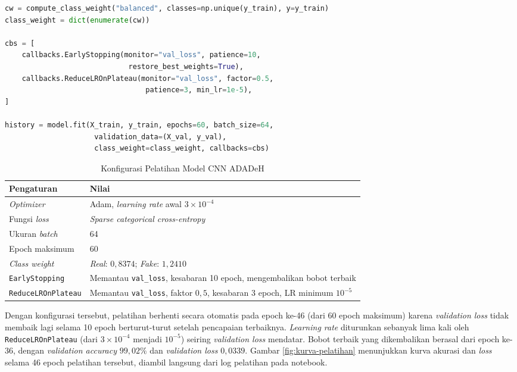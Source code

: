 \begin{lstlisting}[language=Python, caption={Pelatihan model CNN dengan \textit{class weight} dan \textit{callback}}, label={lst:pelatihan}]
cw = compute_class_weight("balanced", classes=np.unique(y_train), y=y_train)
class_weight = dict(enumerate(cw))

cbs = [
    callbacks.EarlyStopping(monitor="val_loss", patience=10,
                             restore_best_weights=True),
    callbacks.ReduceLROnPlateau(monitor="val_loss", factor=0.5,
                                 patience=3, min_lr=1e-5),
]

history = model.fit(X_train, y_train, epochs=60, batch_size=64,
                     validation_data=(X_val, y_val),
                     class_weight=class_weight, callbacks=cbs)
\end{lstlisting}

\begin{table}[htbp]
  \centering
  \caption{Konfigurasi Pelatihan Model CNN ADADeH}
  \label{tab:konfigurasi-pelatihan}
  \begin{tabular}{@{}ll@{}}
    \toprule
    \textbf{Pengaturan} & \textbf{Nilai} \\
    \midrule
    \textit{Optimizer} & Adam, \textit{learning rate} awal $3\times10^{-4}$ \\
    Fungsi \textit{loss} & \textit{Sparse categorical cross-entropy} \\
    Ukuran \textit{batch} & 64 \\
    Epoch maksimum & 60 \\
    \textit{Class weight} & \textit{Real}: $0{,}8374$; \textit{Fake}: $1{,}2410$ \\
    \texttt{EarlyStopping} & Memantau \texttt{val\_loss}, kesabaran 10 epoch, mengembalikan bobot terbaik \\
    \texttt{ReduceLROnPlateau} & Memantau \texttt{val\_loss}, faktor $0{,}5$, kesabaran 3 epoch, LR minimum $10^{-5}$ \\
    \bottomrule
  \end{tabular}
\end{table}

Dengan konfigurasi tersebut, pelatihan berhenti secara otomatis pada epoch ke-46
(dari 60 epoch maksimum) karena \textit{validation loss} tidak membaik lagi selama
10 epoch berturut-turut setelah pencapaian terbaiknya. \textit{Learning rate}
diturunkan sebanyak lima kali oleh \texttt{ReduceLROnPlateau} (dari $3\times10^{-4}$
menjadi $10^{-5}$) seiring \textit{validation loss} mendatar. Bobot terbaik yang
dikembalikan berasal dari epoch ke-36, dengan \textit{validation accuracy}
$99{,}02\%$ dan \textit{validation loss} $0{,}0339$. Gambar
\ref{fig:kurva-pelatihan} menunjukkan kurva akurasi dan \textit{loss} selama 46
epoch pelatihan tersebut, diambil langsung dari log pelatihan pada notebook.

